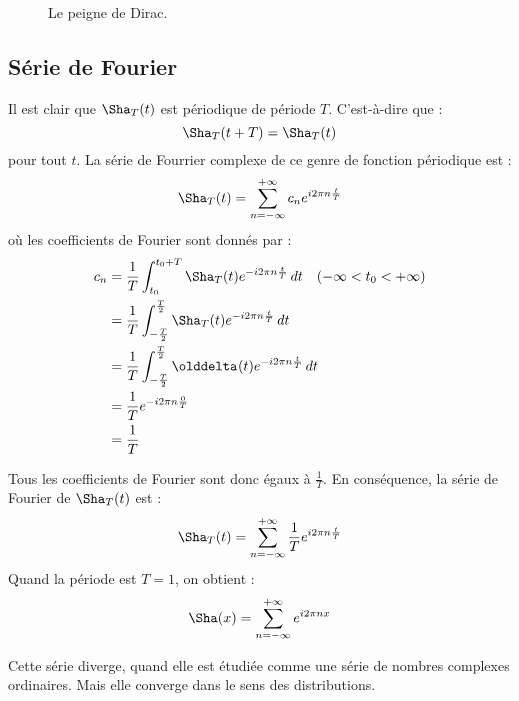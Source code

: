 \begin{figure}[!ht]
    \caption{Le peigne de Dirac.}
    \label{figPeigneDirac}
\end{figure}

\subsection{Série de Fourier}

Il est clair que \(\Sha_T(t)\) est périodique de période \(T\). C’est-à-dire que :
\[
    \Sha_T(t+T) = \Sha_T(t)
\]
pour tout \(t\). La s\'erie de Fourrier complexe de ce genre de fonction p\'eriodique est :
\[
    \Sha_{T}(t)=\sum_{n=-\infty}^{+\infty}c_{n}e^{i2\pi n{\frac{t}{T}}}
\]
o\`u les coefficients de Fourier sont donn\'es par :
\begin{align*}
c_n &= \frac{1}{T} \int_{t_0}^{t_0+T}\Sha_{T}(t)e^{-i2\pi n\frac{t}{T}}\,dt\quad (-\infty < t_0 < +\infty )\\
    &= \frac{1}{T} \int_{-\frac{T}{2}}^{\frac{T}{2}} \Sha_{T}(t) e^{-i2\pi n\frac{t}{T}}\,dt\\
    &= \frac{1}{T} \int_{-\frac{T}{2}}^{\frac{T}{2}} \delta(t) e^{-i2\pi n\frac{t}{T}}\,dt\\
    &= \frac{1}{T} e^{-i2\pi n\frac{0}{T}}\\
    &= \frac{1}{T}
\end{align*}

Tous les coefficients de Fourier sont donc égaux à \(\frac{1}{T}\). En
conséquence, la série de Fourier de \(\Sha_{T}(t)\) est :
\[
    \Sha_{T}(t)=\sum_{n=-\infty}^{+\infty}\frac{1}{T}e^{i2\pi n{\frac{t}{T}}}
\]
Quand la p\'eriode est \(T=1\), on obtient :
\[
    \Sha(x)=\sum_{n=-\infty}^{+\infty}e^{i2\pi n x}
\]

Cette s\'erie diverge, quand elle est \'etudi\'ee comme une s\'erie de nombres complexes 
ordinaires. Mais elle converge dans le sens des distributions.

